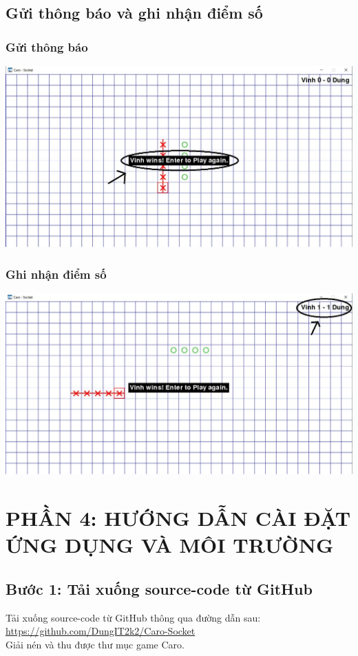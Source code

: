 \documentclass[a4paper]{article}
\begin{document}
\subsection{Gửi thông báo và ghi nhận điểm số}
\subsubsection{Gửi thông báo}
\includegraphics[width=14cm]{images/app/check_win.png}

\subsubsection{Ghi nhận điểm số}
\includegraphics[width=14cm]{images/app/check_score.png}

\newpage
\section*{PHẦN 4: HƯỚNG DẪN CÀI ĐẶT ỨNG DỤNG VÀ MÔI TRƯỜNG}
\setcounter{section}{4}
\setcounter{subsection}{0}

\subsection*{Bước 1: Tải xuống source-code từ GitHub}
\begin{par}
    Tải xuống source-code từ GitHub thông qua đường dẫn sau: \\
    \href{https://github.com/DungIT2k2/Caro-Socket}{https://github.com/DungIT2k2/Caro-Socket} \\
    Giải nén và thu được thư mục game Caro.
\end{par}
\end{document}
